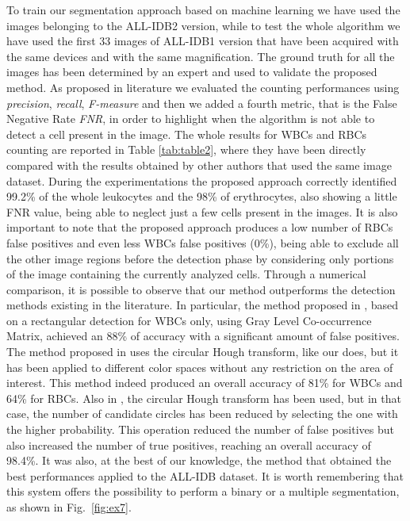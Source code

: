 {	To train our segmentation approach based on machine learning we have used the images belonging to the ALL-IDB2 version, while to test the whole algorithm we have used the first 33 images of ALL-IDB1 version that have been acquired with the same devices and with the same magnification. The ground truth for all the images has been determined by an expert and used to validate the proposed method. As proposed in literature we evaluated the counting performances using \textit{precision}, \textit{recall}, \textit{F-measure} and then we added a fourth metric, that is the False Negative Rate \textit{FNR}, in order to highlight when the algorithm is not able to detect a cell present in the image. The whole results for WBCs and RBCs counting are reported in Table \ref{tab:table2}, where they have been directly compared with the results obtained by other authors that used the same image dataset.
	During the experimentations the proposed approach correctly identified 99.2\% of the whole leukocytes and the 98\% of erythrocytes, also showing a little FNR value, being able to neglect just a few cells present in the images. It is also important to note that the proposed approach produces a low number of RBCs false positives and even less WBCs false positives (0\%), being able to exclude all the other image regions before the detection phase by considering only portions of the image containing the currently analyzed cells. Through a numerical comparison, it is possible to observe that our method outperforms the detection methods existing in the literature. In particular, the method proposed in \cite{Alilou}, based on a rectangular detection for WBCs only, using Gray Level Co-occurrence Matrix, achieved an 88\% of accuracy with a significant amount of false positives. The method proposed in \cite{Mahmood} uses the circular Hough transform, like our does, but it has been applied to different color spaces without any restriction on the area of interest. This method indeed produced an overall accuracy of 81\% for WBCs and 64\% for RBCs. Also in \cite{Alomari}, the circular Hough transform has been used, but in that case, the number of candidate circles has been reduced by selecting the one with the higher probability. This operation reduced the number of false positives but also increased the number of true positives, reaching an overall accuracy of 98.4\%. It was also, at the best of our knowledge, the method that obtained the best performances applied to the ALL-IDB dataset. 
	It is worth remembering that this system offers the possibility to perform a binary or a multiple segmentation, as shown in Fig.~\ref{fig:ex7}.
	
}
